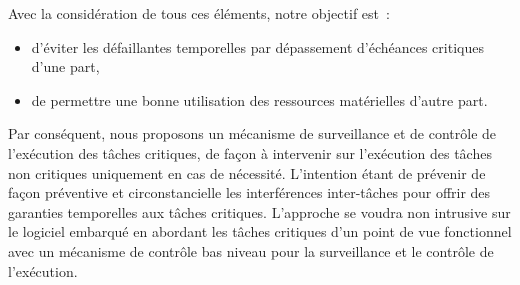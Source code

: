 \documentclass[french, a4paper, 11pt, twoside, pdftex]{StyleThese}
\begin{document}
   Avec la considération de tous ces éléments, notre objectif est~:
   \begin{itemize}
   	\item 	d'éviter les défaillantes temporelles par dépassement d'échéances critiques d'une part, 
   	\item   de permettre une bonne utilisation des ressources matérielles d'autre part.
   \end{itemize} 
	Par conséquent, nous proposons un mécanisme de surveillance et de contrôle de l'exécution des tâches critiques, de façon à intervenir sur l'exécution des tâches non critiques uniquement en cas de nécessité. L'intention étant de prévenir de façon préventive et circonstancielle les interférences inter-tâches pour offrir des garanties temporelles aux tâches critiques. L'approche se voudra non intrusive sur le logiciel embarqué en abordant les tâches critiques d'un point de vue fonctionnel avec un mécanisme de contrôle bas niveau pour la surveillance et le contrôle de l'exécution.  

\ifdefined{}
\else


\end{document}
